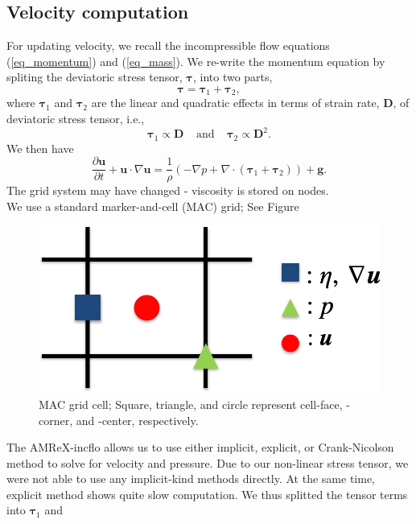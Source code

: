 \subsection{Velocity computation}
For updating velocity, we recall the incompressible flow equations (\ref{eq_momentum}) and (\ref{eq_mass}). We re-write the momentum equation by spliting the deviatoric stress tensor, ${\bm \tau}$, into two parts, 
\[
 {\bm \tau}= {\bm \tau_1} + {\bm \tau_2},
\] 
where ${\bm \tau_1}$ and ${\bm \tau_2}$ are the linear and quadratic effects in terms of strain rate, ${\bm D}$, of deviatoric stress tensor, i.e., 
\[
  {\boldsymbol \tau_1} \propto \boldsymbol{D}
  \ \ \ \ \ \text{and}
   \ \ \ \ \ 
{\boldsymbol \tau_2} \propto {\boldsymbol D^2}.
\]
We then have
\begin{equation}
  \frac{\partial {\bm u}}{\partial t} 
  + {\bm u} \cdot \nabla {\bm u} = \frac{1}{\rho}
  \left( 
    -\nabla p + \nabla \cdot \left( {\bm \tau_1} + {\bm \tau_2} \right)\right) + {\bm g}.
  \label{eq_momentum2}
\end{equation}
{\color{red} The grid system may have changed - viscosity is stored on nodes.}
\\
We use a standard marker-and-cell (MAC) grid; See Figure 
\begin{figure}[ht]
	\begin{center}
	
		\includegraphics[scale=0.5]{figures/fig_mac_grid.png}
		\caption{MAC grid cell; Square, triangle, and circle represent cell-face, -corner, and -center, respectively.}
	\label{fig_mac_grid}
	\end{center}
\end{figure}
The AMReX-incflo allows us to use either implicit, explicit, or Crank-Nicolson method to solve for velocity and pressure. Due to our non-linear stress tensor, we were not able to use any implicit-kind methods directly. At the same time, explicit method shows quite slow computation. We thus splitted the tensor terms into ${\bm \tau_1}$ and
